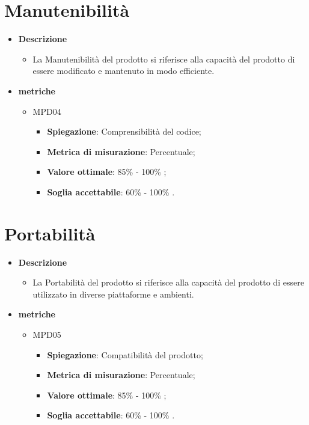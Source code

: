 \section{Manutenibilità}
\begin{itemize}
    \item \textbf{Descrizione}
    \begin{itemize}
        \item La Manutenibilità del prodotto si riferisce alla capacità del prodotto di essere modificato e mantenuto in modo efficiente.
    \end{itemize}
    
    \item \textbf{metriche}
    \begin{itemize}
        \item MPD04
        \begin{itemize}
            \item \textbf{Spiegazione}: Comprensibilità del codice;
        \item \textbf{Metrica di misurazione}: Percentuale;
        \item \textbf{Valore ottimale}: 85\% - 100\% ;
        \item \textbf{Soglia accettabile}: 60\% - 100\% .
        \end{itemize}
    \end{itemize}
    \end{itemize}


\section{Portabilità}
\begin{itemize}
    \item \textbf{Descrizione}
    \begin{itemize}
        \item La Portabilità del prodotto si riferisce alla capacità del prodotto di essere utilizzato in diverse piattaforme e ambienti.
    \end{itemize}
    
    \item \textbf{metriche}
    \begin{itemize}
        \item MPD05
        \begin{itemize}
            \item \textbf{Spiegazione}: Compatibilità del prodotto;
        \item \textbf{Metrica di misurazione}: Percentuale;
        \item \textbf{Valore ottimale}: 85\% - 100\% ;
        \item \textbf{Soglia accettabile}: 60\% - 100\% .
        \end{itemize}
    \end{itemize}
    \end{itemize}



